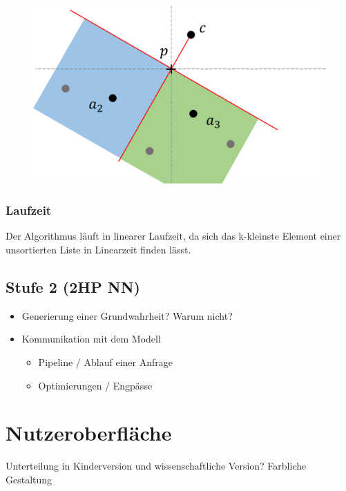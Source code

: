 \documentclass[a4paper]{extarticle}
\begin{document}
    \begin{figure}[!ht]
        \centering	
        \includegraphics[scale=0.15]{bilder/tri_konstr.pdf}
        \label{fig:triangulation_hilfssatz_2}
    \end{figure}

    \subsubsection{Laufzeit}
    Der Algorithmus läuft in linearer Laufzeit, da sich das k-kleinste Element einer unsortierten
    Liste in Linearzeit finden lässt.
    
    \subsection{Stufe 2 (2HP NN)}
    \begin{itemize}
        \item Generierung einer Grundwahrheit? Warum nicht?
        \item Kommunikation mit dem Modell
        \begin{itemize}
            \item Pipeline / Ablauf einer Anfrage
            \item Optimierungen / Engpässe
        \end{itemize}
    \end{itemize}

    \section{Nutzeroberfläche}

    Unterteilung in Kinderversion und wissenschaftliche Version?
    Farbliche Gestaltung
    
\end{document}
